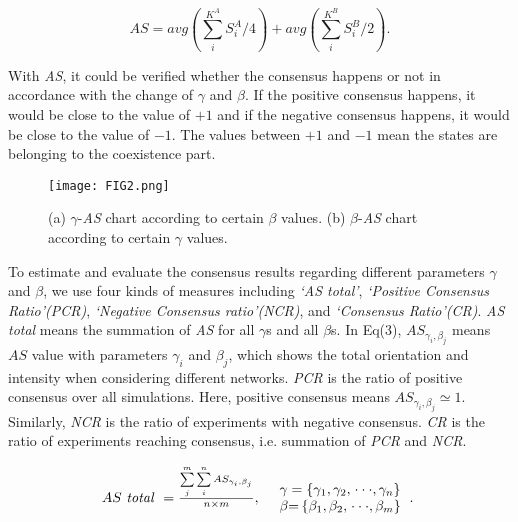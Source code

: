 \documentclass[english]{cccconf}
\begin{document}
\begin{equation}
AS = avg\left( {\sum\limits_i^{{K^A}} {S_i^A/4} } \right) + avg\left( {\sum\limits_i^{{K^B}} {S_i^B/2} } \right).
\end{equation}

With \textit{AS}, it could be verified whether the consensus happens or not in accordance with the change of $\gamma$ and $\beta$.  If the positive consensus happens, it would be close to the value of $+1$ and if the negative consensus happens, it would be close to the value of $-1$. The values between $+1$ and $-1$ mean the states are belonging to the coexistence part.

\begin{figure*}[!htb]
	\centering
	\texttt{[image: FIG2.png]}
	\caption{(a) $\gamma$-\textit{AS} chart according to certain $\beta$ values. (b) $\beta$-\textit{AS} chart according to certain $\gamma$ values.}
	\label{Fig2}
\end{figure*}

To estimate and evaluate the consensus results regarding different parameters $\gamma$ and $\beta$, we use four kinds of measures including \textit{`AS total'}, \textit{`Positive Consensus Ratio'(PCR)}, \textit{`Negative Consensus ratio'(NCR)}, and \textit{`Consensus Ratio'(CR)}. \textit{AS total} means the summation of \textit{AS} for all $\gamma$s and all $\beta$s. In Eq(3), ${A{S_{{\gamma _i},{\beta _j}}}}$ means $AS$ value with parameters $\gamma_i$ and $\beta_j$, which shows the total orientation and intensity when considering different networks. \textit{PCR} is the ratio of positive consensus over all simulations. Here, positive consensus means  ${A{S_{{\gamma _i},{\beta _j}}} \simeq  1}$. Similarly, \textit{NCR} is the ratio of experiments with negative consensus. \textit{CR} is the ratio of experiments reaching consensus, i.e. summation of \textit{PCR} and \textit{NCR}.

\begin{equation}
\begin{array}{cl}
AS\mbox{ \textit{total} } = \frac{{\sum\limits_j^m {\sum\limits_i^n {A{S_{{\gamma _i},{\beta _j}}}} } }}{{n \times m }}, &
\begin{array}{l}
\gamma  = \left\{ {{\gamma _{\rm{1}}},{\gamma _{\rm{2}}},\left. {\cdot\cdot\cdot,{\gamma _n}} \right\}} \right.\\
\beta {\rm{ = }}\left\{ {{\beta _{\rm{1}}},{\beta _{\rm{2}}},\left. {\cdot\cdot\cdot,{\beta _m}} \right\}} \right.
\end{array}.\
\end{array}
\end{equation}
\end{document}
